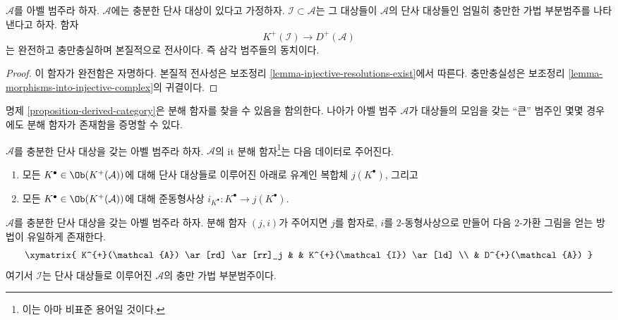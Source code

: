 \begin{proposition}
\label{proposition-derived-category}
$\mathcal{A}$를 아벨 범주라 하자. $\mathcal{A}$에는 충분한 단사 대상이
있다고 가정하자. $\mathcal{I} \subset \mathcal{A}$는 그 대상들이
$\mathcal{A}$의 단사 대상들인 엄밀히 충만한 가법 부분범주를
나타낸다고 하자. 함자
$$
K^{+}(\mathcal{I}) \longrightarrow D^{+}(\mathcal{A})
$$
는 완전하고 충만충실하며 본질적으로 전사이다. 즉 삼각 범주들의
동치이다.
\end{proposition}

\begin{proof}
이 함자가 완전함은 자명하다. 본질적 전사성은 보조정리
\ref{lemma-injective-resolutions-exist}에서 따른다.
충만충실성은 보조정리 \ref{lemma-morphisms-into-injective-complex}의
귀결이다.
\end{proof}

\noindent
명제 \ref{proposition-derived-category}은 분해 함자를 찾을 수 있음을
함의한다. 나아가 아벨 범주 $\mathcal{A}$가 대상들의 모임을 갖는
``큰'' 범주인 몇몇 경우에도 분해 함자가 존재함을 증명할 수 있다.

\begin{definition}
\label{definition-localization-functor}
$\mathcal{A}$를 충분한 단사 대상을 갖는 아벨 범주라 하자.
$\mathcal{A}$의 {it 분해 함자}\footnote{이는 아마 비표준 용어일 것이다.}는
다음 데이터로 주어진다.
\begin{enumerate}
\item 모든 $K^\bullet \in \Ob(K^{+}(\mathcal{A}))$에 대해 단사
대상들로 이루어진 아래로 유계인 복합체 $j(K^\bullet)$, 그리고
\item 모든 $K^\bullet \in \Ob(K^{+}(\mathcal{A}))$에 대해 준동형사상
$i_{K^\bullet} : K^\bullet \to j(K^\bullet)$.
\end{enumerate}
\end{definition}

\begin{lemma}
\label{lemma-resolution-functor}
$\mathcal{A}$를 충분한 단사 대상을 갖는 아벨 범주라 하자.
분해 함자 $(j, i)$가 주어지면 $j$를 함자로, $i$를 $2$-동형사상으로
만들어 다음 $2$-가환 그림을 얻는 방법이 유일하게 존재한다.
$$
\xymatrix{
K^{+}(\mathcal{A}) \ar[rd] \ar[rr]_j & & K^{+}(\mathcal{I}) \ar[ld] \\
& D^{+}(\mathcal{A})
}
$$
여기서 $\mathcal{I}$는 단사 대상들로 이루어진 $\mathcal{A}$의 충만
가법 부분범주이다.
\end{lemma}

